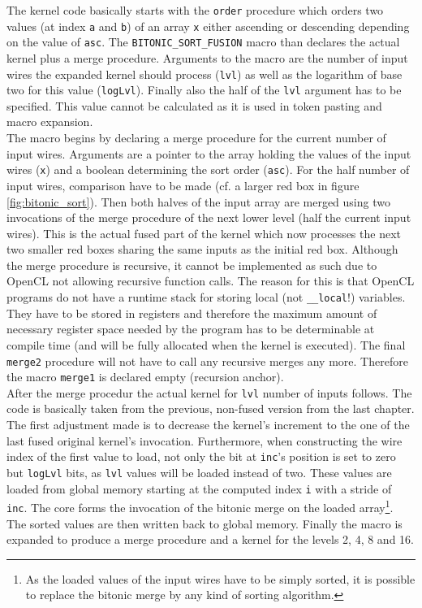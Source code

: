 The kernel code basically starts with the \lstinline!order! procedure which orders two values (at index \lstinline!a! and \lstinline!b!) of an array \lstinline!x! either ascending or descending depending on the value of \lstinline!asc!. The \lstinline!BITONIC_SORT_FUSION! macro than declares the actual kernel plus a merge procedure. Arguments to the macro are the number of input wires the expanded kernel should process (\lstinline!lvl!) as well as the logarithm of base two for this value (\lstinline!logLvl!). Finally also the half of the \lstinline!lvl! argument has to be specified. This value cannot be calculated as it is used in token pasting and macro expansion. \\
The macro begins by declaring a merge procedure for the current number of input wires. Arguments are a pointer to the array holding the values of the input wires (\lstinline!x!) and a boolean determining the sort order (\lstinline!asc!). For the half number of input wires, comparison have to be made (cf. a larger red box in figure \ref{fig:bitonic_sort}). Then both halves of the input array are merged using two invocations of the merge procedure of the next lower level (half the current input wires). This is the actual fused part of the kernel which now processes the next two smaller red boxes sharing the same inputs as the initial red box. Although the merge procedure is recursive, it cannot be implemented as such due to OpenCL not allowing recursive function calls. The reason for this is that OpenCL programs do not have a runtime stack for storing local (not \lstinline!__local!!) variables. They have to be stored in registers and therefore the maximum amount of necessary register space needed by the program has to be determinable at compile time (and will be fully allocated when the kernel is executed). The final \lstinline!merge2! procedure will not have to call any recursive merges any more. Therefore the macro \lstinline!merge1! is declared empty (recursion anchor). \\
After the merge procedur the actual kernel for \lstinline!lvl! number of inputs follows. The code is basically taken from the previous, non-fused version from the last chapter. The first adjustment made is to decrease the kernel's increment to the one of  the last fused original kernel's invocation. Furthermore, when constructing the wire index of the first value to load, not only the bit at \lstinline!inc!'s position is set to zero but \lstinline!logLvl! bits, as \lstinline!lvl! values will be loaded instead of two. These values are loaded from global memory starting at the computed index \lstinline!i! with a stride of \lstinline!inc!. The core forms the invocation of the bitonic merge on the loaded array\footnote{As the loaded values of the input wires have to be simply sorted, it is possible to replace the bitonic merge by any kind of sorting algorithm.}. The sorted values are then written back to global memory.
Finally the macro is expanded to produce a merge procedure and a kernel for the levels 2, 4, 8 and 16.

